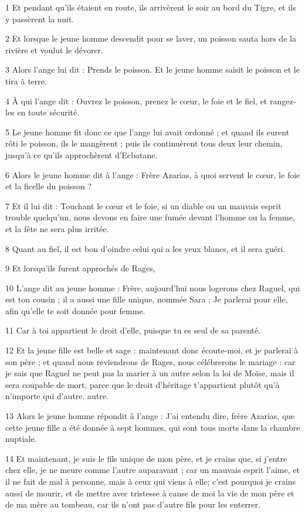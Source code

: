 \par 1 Et pendant qu'ils étaient en route, ils arrivèrent le soir au bord du Tigre, et ils y passèrent la nuit.
\par 2 Et lorsque le jeune homme descendit pour se laver, un poisson sauta hors de la rivière et voulut le dévorer.
\par 3 Alors l'ange lui dit : Prends le poisson. Et le jeune homme saisit le poisson et le tira à terre.
\par 4 À qui l'ange dit : Ouvrez le poisson, prenez le cœur, le foie et le fiel, et rangez-les en toute sécurité.
\par 5 Le jeune homme fit donc ce que l'ange lui avait ordonné ; et quand ils eurent rôti le poisson, ils le mangèrent ; puis ils continuèrent tous deux leur chemin, jusqu'à ce qu'ils approchèrent d'Ecbatane.
\par 6 Alors le jeune homme dit à l'ange : Frère Azarias, à quoi servent le cœur, le foie et la ficelle du poisson ?
\par 7 Et il lui dit : Touchant le cœur et le foie, si un diable ou un mauvais esprit trouble quelqu'un, nous devons en faire une fumée devant l'homme ou la femme, et la fête ne sera plus irritée.
\par 8 Quant au fiel, il est bon d'oindre celui qui a les yeux blancs, et il sera guéri.
\par 9 Et lorsqu'ils furent approchés de Rages,
\par 10 L'ange dit au jeune homme : Frère, aujourd'hui nous logerons chez Raguel, qui est ton cousin ; il a aussi une fille unique, nommée Sara ; Je parlerai pour elle, afin qu'elle te soit donnée pour femme.
\par 11 Car à toi appartient le droit d'elle, puisque tu es seul de sa parenté.
\par 12 Et la jeune fille est belle et sage : maintenant donc écoute-moi, et je parlerai à son père ; et quand nous reviendrons de Rages, nous célébrerons le mariage : car je sais que Raguel ne peut pas la marier à un autre selon la loi de Moïse, mais il sera coupable de mort, parce que le droit d'héritage t'appartient plutôt qu'à n'importe qui d'autre. autre.
\par 13 Alors le jeune homme répondit à l'ange : J'ai entendu dire, frère Azarias, que cette jeune fille a été donnée à sept hommes, qui sont tous morts dans la chambre nuptiale.
\par 14 Et maintenant, je suis le fils unique de mon père, et je crains que, si j'entre chez elle, je ne meure comme l'autre auparavant ; car un mauvais esprit l'aime, et il ne fait de mal à personne, mais à ceux qui viens à elle; c'est pourquoi je crains aussi de mourir, et de mettre avec tristesse à cause de moi la vie de mon père et de ma mère au tombeau, car ils n'ont pas d'autre fils pour les enterrer.
